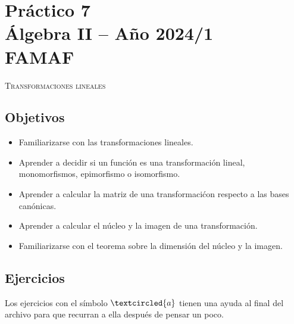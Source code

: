 \section*{ Práctico 7 \\ Álgebra  II -- Año 2024/1 \\ FAMAF}

    

\centerline{\textsc{Transformaciones lineales}}

\subsection*{Objetivos}

\begin{itemize}
 \item Familiarizarse con las transformaciones lineales.
 \item Aprender a decidir si un función es una transformación lineal, monomorfismos, epimorfismo o isomorfismo.
 \item Aprender a calcular la matriz de una transformaci\'con respecto a las bases canónicas.
 \item Aprender a calcular el núcleo y la imagen de una transformación.

 \item Familiarizarse con el teorema sobre la dimensión del núcleo y la imagen.
\end{itemize}



\subsection*{Ejercicios} Los ejercicios con el símbolo $\textcircled{a}$ tienen una ayuda al final del archivo para que recurran a ella después de pensar un poco.

